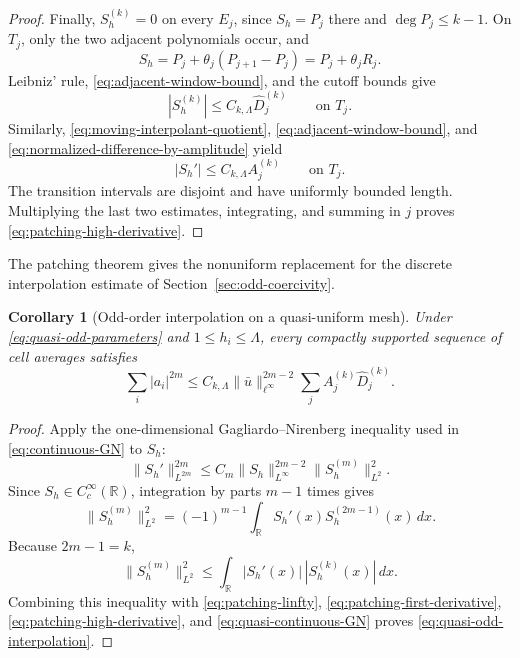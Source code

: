 \documentclass[11pt]{amsart}
\theoremstyle{plain}
\newtheorem{corollary}[theorem]{Corollary}
\theoremstyle{definition}
\theoremstyle{remark}
\numberwithin{equation}{section}
\theoremstyle{plain}
\begin{document}
\begin{proof}
	Finally, $S_h^{(k)}=0$ on every $E_j$, since $S_h=P_j$ there and
	$\deg P_j\le k-1$.  On $T_j$, only the two adjacent polynomials occur, and
	\begin{equation}\label{eq:patched-function-on-transition}
		S_h=P_j+\theta_j(P_{j+1}-P_j)
		=P_j+\theta_jR_j.
	\end{equation}
	Leibniz' rule, \eqref{eq:adjacent-window-bound}, and the cutoff bounds give
	\begin{equation}\label{eq:patched-high-derivative-pointwise}
		|S_h^{(k)}|
		\le C_{k,\Lambda}\widehat D_j^{(k)}
		\qquad\text{on }T_j.
	\end{equation}
	Similarly, \eqref{eq:moving-interpolant-quotient},
	\eqref{eq:adjacent-window-bound}, and
	\eqref{eq:normalized-difference-by-amplitude} yield
	\begin{equation}\label{eq:patched-first-derivative-pointwise}
		|S_h'|
		\le C_{k,\Lambda}A_j^{(k)}
		\qquad\text{on }T_j.
	\end{equation}
	The transition intervals are disjoint and have uniformly bounded length.
	Multiplying the last two estimates, integrating, and summing in $j$ proves
	\eqref{eq:patching-high-derivative}.
\end{proof}

The patching theorem gives the nonuniform replacement for the discrete
interpolation estimate of Section~\ref{sec:odd-coercivity}.

\begin{corollary}[Odd-order interpolation on a quasi-uniform mesh]
	\label{cor:quasi-odd-interpolation}
	Under \eqref{eq:quasi-odd-parameters} and $1\le h_i\le\Lambda$, every
	compactly supported sequence of cell averages satisfies
	\begin{equation}\label{eq:quasi-odd-interpolation}
		\sum_i|a_i|^{2m}
		\le C_{k,\Lambda}
		\|\bar u\|_{\ell^\infty}^{2m-2}
		\sum_j A_j^{(k)}\widehat D_j^{(k)}.
	\end{equation}
\end{corollary}

\begin{proof}
	Apply the one-dimensional Gagliardo--Nirenberg inequality used in
	\eqref{eq:continuous-GN} to $S_h$:
	\begin{equation}\label{eq:quasi-continuous-GN}
		\|S_h'\|_{L^{2m}}^{2m}
		\le C_m\|S_h\|_{L^\infty}^{2m-2}
		\|S_h^{(m)}\|_{L^2}^{2}.
	\end{equation}
	Since $S_h\in C_c^\infty(\mathbb R)$, integration by parts $m-1$ times
	gives
	\begin{equation}\label{eq:quasi-integration-by-parts}
		\|S_h^{(m)}\|_{L^2}^{2}
		=
		(-1)^{m-1}
		\int_{\mathbb R}S_h'(x)S_h^{(2m-1)}(x)\,dx.
	\end{equation}
	Because $2m-1=k$,
	\[
	\|S_h^{(m)}\|_{L^2}^{2}
	\le
	\int_{\mathbb R}|S_h'(x)|\,|S_h^{(k)}(x)|\,dx.
	\]
	Combining this inequality with
	\eqref{eq:patching-linfty},
	\eqref{eq:patching-first-derivative},
	\eqref{eq:patching-high-derivative}, and
	\eqref{eq:quasi-continuous-GN} proves
	\eqref{eq:quasi-odd-interpolation}.
\end{proof}
\end{document}
